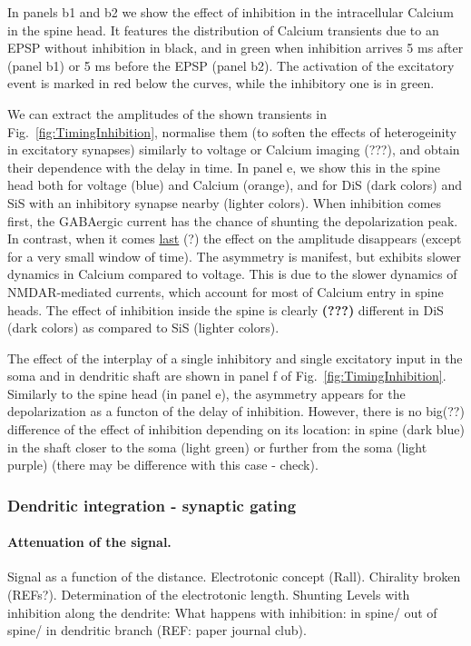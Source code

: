 \documentclass[10pt,letterpaper]{article}
\begin{document}
In panels b1 and b2 we show the effect of inhibition in the intracellular Calcium in the spine head. It features the distribution of Calcium transients due to an EPSP without inhibition in black, and in green when inhibition arrives 5 ms after (panel b1) or 5 ms before the EPSP (panel b2). The activation of the excitatory event is marked in red  below the curves, while the inhibitory one is in green.

We can extract the amplitudes of the shown transients in Fig.~\ref{fig:TimingInhibition}, normalise them (to soften the effects of heterogeinity in excitatory synapses) similarly to voltage or Calcium imaging {(???)}, and obtain their dependence with the delay in time. In panel e, we show this in the spine head both for voltage (blue) and Calcium (orange), and for DiS (dark colors) and SiS with an inhibitory synapse nearby (lighter colors). When inhibition comes first, the GABAergic current has the chance of shunting the depolarization peak. In contrast, when it comes \underline{last} (?) the effect on the amplitude disappears (except for a very small window of time). The asymmetry is manifest, but exhibits slower dynamics in Calcium compared to voltage. This is due to the slower dynamics of NMDAR-mediated currents, which account for most of  Calcium entry in spine heads. The effect of inhibition inside the spine is clearly \textbf{(???)} different in DiS (dark colors) as compared to SiS (lighter colors). 

The effect of the interplay of a single inhibitory and single excitatory input in the soma and in dendritic shaft are shown in panel f of Fig.~\ref{fig:TimingInhibition}. Similarly to the spine head (in panel e), the asymmetry appears for the depolarization as a functon of the delay of inhibition. However, there is no big(??) difference of the effect of inhibition depending on its location: in spine (dark blue) in the shaft closer to the soma (light green) or further from the soma   (light purple) (there may be difference with this case - check). 


\subsubsection*{Dendritic integration - synaptic gating}
\paragraph*{Attenuation of the signal.} Signal as a function of the distance. Electrotonic concept (Rall). Chirality broken (REFs?). Determination of the electrotonic length. Shunting Levels with inhibition along the dendrite: What happens with inhibition: in spine/ out of spine/ 
in dendritic branch (REF: paper journal club).
\end{document}
